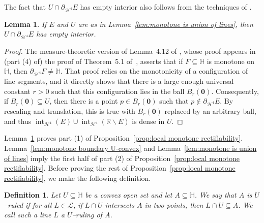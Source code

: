 \documentclass[11pt,reqno]{amsart}
\renewcommand{\H}{\mathbb{H}}
\newcommand{\R}{\mathbb{R}}
\newcommand{\cH}{\mathcal{H}}
\newcommand{\cL}{\mathcal{L}}
\newcommand{\0}{\mathbf{0}}
\renewcommand{\1}{\mathbf 1}
\renewcommand{\subset}{\subseteq}
\renewcommand{\setminus}{\smallsetminus}
\newtheorem{lemma}[thm]{Lemma}
\newtheorem{defn}[thm]{Definition}
\theoremstyle{remark}
\DeclareMathOperator{\inter}{int}
\begin{document}
The fact that $U\cap \partial_{\cH^4} E$ has empty interior also follows from the techniques of \cite{CheegerKleinerMetricDiff}.
\begin{lemma}\label{lem:empty interior}
  If $E$ and $U$ are as in Lemma~\ref{lem:monotone is union of lines}, then $U\cap \partial_{\cH^4} E$ has empty interior.
\end{lemma}
\begin{proof}
  The measure-theoretic version of Lemma~4.12 of \cite{CheegerKleinerMetricDiff}, whose proof appears in (part (4) of) the proof of Theorem~5.1 of~\cite{CheegerKleinerMetricDiff}, asserts that if $F\subset \H$ is monotone on $\H$, then $\partial_{\cH^4} F\ne \H$.  That proof  relies on the monotonicity of a configuration of line segments, and it directly shows that there is a large enough universal constant  $r>0$ such that this configuration lies in the ball $B_r(\mathbf{0})$.  Consequently, if $B_r(\mathbf{0})\subset U$, then there is a point $p\in B_r(\mathbf{0})$ such that $p\not \in \partial_{\cH^4} E$.  By rescaling and translation, this is true with $B_r(\mathbf{0})$ replaced by an arbitrary ball, and thus $\inter_{\cH^4}(E)\cup \inter_{\cH^4}(\R\setminus E)$ is dense in $U$.
\end{proof}

Lemma~\ref{lem:empty interior} proves part (1) of Proposition~\ref{prop:local monotone rectifiability}. Lemma~\ref{lem:monotone boundary U-convex} and Lemma~\ref{lem:monotone is union of lines}  imply the first half of part (2) of Proposition~\ref{prop:local monotone rectifiability}.  Before proving the rest of Proposition~\ref{prop:local monotone rectifiability}, we make the following definition.

\begin{defn}
  Let $U\subset \H$ be a convex open set and let $A\subset \H$.  We say that $A$ is \emph{$U$--ruled} if for all $L\in \cL$, if $L\cap U$ intersects $A$ in two points, then $L\cap U\subset A$.  We call such a line $L$ a $U$--\emph{ruling} of $A$.
\end{defn}
\end{document}
